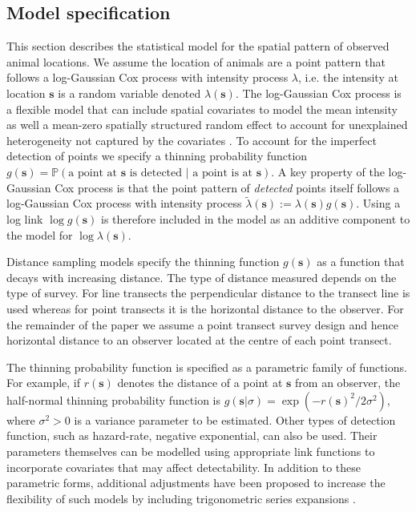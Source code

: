\documentclass{stylefile16/statsoc}
\newcommand{\bs}{\mathbf{s}}
\newcommand{\tl}{\tilde{\lambda}}   %
\begin{document}
\subsection{Model specification}

This section describes the statistical model for the spatial pattern of observed animal locations. We assume the location of animals are a point pattern that follows a log-Gaussian Cox process with intensity process $\lambda$, i.e.  the intensity at location $\bs$ is a random variable denoted $\lambda(\bs)$.  The log-Gaussian Cox process is a flexible model that can include spatial covariates to model the mean intensity as well a mean-zero spatially structured random effect to account for unexplained heterogeneity not captured by the covariates \citep{moller_log_1998}.  To account for the imperfect detection of points we specify a thinning probability function $g(\bs) = \mathbb{P}(\text{a point at $\bs$ is detected } |\text{ a point is at $\bs$})$. A key property of the log-Gaussian Cox process is that the point pattern of \textit{detected} points itself follows a log-Gaussian Cox process with intensity process $\tl(\bs) := \lambda(\bs)g(\bs)$.  Using a log link $\log g(\bs)$ is therefore included in the model as an additive component to the model for $\log \lambda(\bs)$.  

Distance sampling models specify the thinning function $g(\bs)$ as a function that decays with increasing distance.  The type of distance measured depends on the type of survey.  For line transects the perpendicular distance to the transect line is used whereas for point transects it is the horizontal distance to the observer.  For the remainder of the paper we assume a point transect survey design and hence horizontal distance to an observer located at the centre of each point transect.  

The thinning probability function is specified as a parametric family of functions. For example, if $r(\bs)$ denotes the distance of a point at $\bs$ from an observer, the half-normal thinning probability function is $g(\bs | \sigma) = \exp(-r(\bs)^2 / 2\sigma^2)$, where $\sigma^2 > 0$ is a variance parameter to be estimated.  Other types of detection function, such as hazard-rate, negative exponential, can also be used. Their parameters themselves can be modelled using appropriate link functions to incorporate covariates that may affect detectability.  In addition to these parametric forms, additional adjustments have been proposed to increase the flexibility of such models by including trigonometric series expansions \citep{buckland_distance_2015}.  
\end{document}
